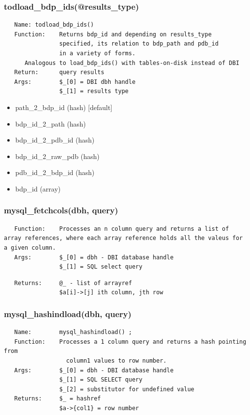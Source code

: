 \documentclass{article}
\begin{document}
\subsubsection*{todload\_bdp\_ids(@results\_type)\label{pibase_pm_todload_bdp_ids_results_type_}}
\begin{verbatim}
   Name: todload_bdp_ids()
   Function:    Returns bdp_id and depending on results_type
                specified, its relation to bdp_path and pdb_id
                in a variety of forms.
      Analogous to load_bdp_ids() with tables-on-disk instead of DBI
   Return:      query results
   Args:        $_[0] = DBI dbh handle
                $_[1] = results type
\end{verbatim}
\begin{itemize}

\item path\_2\_bdp\_id (hash) [default]
\item bdp\_id\_2\_path (hash)
\item bdp\_id\_2\_pdb\_id (hash)
\item bdp\_id\_2\_raw\_pdb (hash)
\item pdb\_id\_2\_bdp\_id (hash)
\item bdp\_id (array)\end{itemize}
\subsubsection*{mysql\_fetchcols(dbh, query)\label{pibase_pm_mysql_fetchcols_dbh_query_}}
\begin{verbatim}
   Function:    Processes an n column query and returns a list of array references, where each array reference holds all the valeus for a given column.
   Args:        $_[0] = dbh - DBI database handle
                $_[1] = SQL select query
\end{verbatim}
\begin{verbatim}
   Returns:     @_ - list of arrayref
                $a[i]->[j] ith column, jth row
\end{verbatim}
\subsubsection*{mysql\_hashindload(dbh, query)\label{pibase_pm_mysql_hashindload_dbh_query_}}
\begin{verbatim}
   Name:        mysql_hashindload() ;
   Function:    Processes a 1 column query and returns a hash pointing from
                  column1 values to row number.
   Args:        $_[0] = dbh - DBI database handle
                $_[1] = SQL SELECT query
                $_[2] = substitutor for undefined value
   Returns:     $_ = hashref
                $a->{col1} = row number
\end{verbatim}
\end{document}
